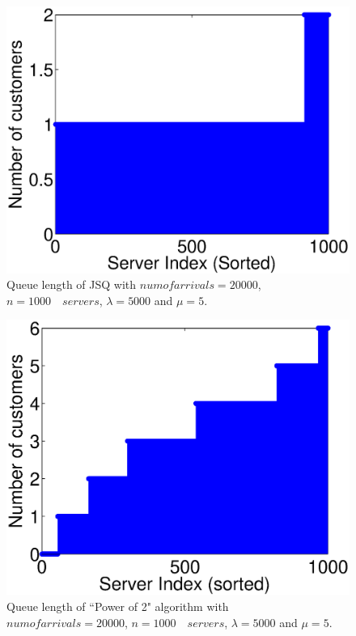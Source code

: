 \documentclass[a4paper,english,12pt]{article}
\begin{document}
\begin{figure}[H]
\centering
\includegraphics[scale=0.50]{JSQ_quelength.eps}
\caption{Queue length of JSQ with $num of arrivals = 20000$, $n = 1000 \quad servers$, $\lambda = 5000$ and $\mu = 5$.} 
\end{figure}

\begin{figure}[H]
\centering
\includegraphics[scale=0.55]{Powerof2_quelengthN1000lambda5000.eps}
\caption{Queue length of ``Power of 2" algorithm with $num of arrivals = 20000$, $n = 1000 \quad servers$, $\lambda = 5000$ and $\mu = 5$.} 
\end{figure}
\end{document}
